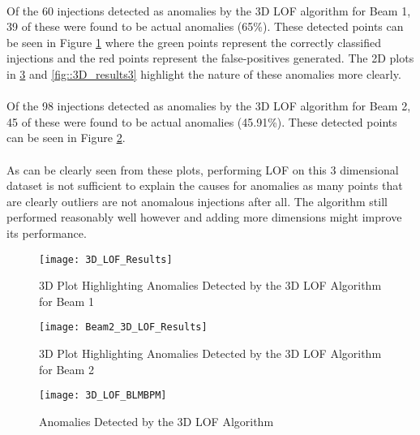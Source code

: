 \paragraph{ }Of the  60 injections detected as anomalies by the 3D \acs{LOF} algorithm for Beam 1, 39 of these were found to be actual anomalies (65\%). These detected points can be seen in Figure \ref{fig::3D_results1} where the green points represent the correctly classified injections and the red points represent the false-positives generated. The 2D plots in \ref{fig::3D_results2} and \ref{fig::3D_results3} highlight the nature of these anomalies more clearly. 

\paragraph{ }Of the 98 injections detected as anomalies by the 3D \acs{LOF} algorithm for Beam 2, 45 of these were found to be actual anomalies (45.91\%). These detected points can be seen in Figure \ref{fig::3D_results1_B2}.

\paragraph{ }As can be clearly seen from these plots, performing \acs{LOF} on this 3 dimensional dataset is not sufficient to explain the causes for anomalies as many points that are clearly outliers are not anomalous injections after all. The algorithm still performed reasonably well however and adding more dimensions might improve its performance.

\begin{figure}[h]
	\centering
	\texttt{[image: 3D\_LOF\_Results]}
	\caption[3D LoF Results Beam 1]{3D Plot Highlighting Anomalies Detected by the 3D LOF Algorithm for Beam 1}
	\label{fig::3D_results1}
\end{figure}

\begin{figure}[H]
	\centering
	\texttt{[image: Beam2\_3D\_LOF\_Results]}
	\caption[3D LoF Results Beam 2]{3D Plot Highlighting Anomalies Detected by the 3D LOF Algorithm for Beam 2}
	\label{fig::3D_results1_B2}
\end{figure}    


\begin{figure}[H]
	\centering
	\texttt{[image: 3D\_LOF\_BLMBPM]}
	\caption[3D LoF Results 2]{Anomalies Detected by the 3D LOF Algorithm}
	\label{fig::3D_results2}
\end{figure}  

